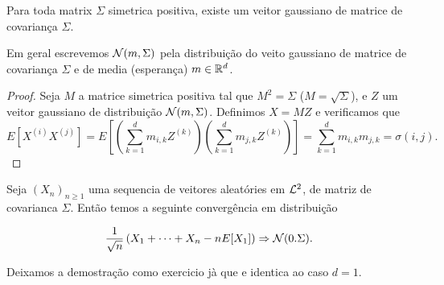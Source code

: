 \begin{proposition}
Para toda matrix $\Sigma$ simetrica positiva, existe um veitor gaussiano de matrice de covariança $\Sigma$.
\end{proposition}
Em geral escrevemos ${\mathcal N}(m,\Sigma)$ pela distribuição do veito gaussiano de matrice de covariança $\Sigma$ e de media (esperança) $m\in {\ensuremath{\mathbb R}}^d$.

\begin{proof}
 Seja $M$ a matrice simetrica positiva tal que $M^2=\Sigma$ ($M=\sqrt{\Sigma}$), e $Z$ um veitor gaussiano de distribuição ${\mathcal N}(m,\Sigma)$.
 Definimos $X=MZ$ e verificamos que
 \begin{equation}
 E[X^{(i)}X^{(j)}]=E[ \left(\sum_{k=1}^d m_{i,k} Z^{(k)}\right)\left(\sum_{k=1}^d m_{j,k} Z^{(k)}\right)]= \sum_{k=1}^d m_{i,k}m_{j,k}= \sigma(i,j).
\end{equation}
 \end{proof}


\begin{theorem}
 Seja $(X_n)_{n\ge 1}$ uma sequencia de veitores aleatóries em ${\mathcal L}^2$, de matriz de covarianca $\Sigma$.
 Então temos a seguinte convergência em distribuição

 \begin{equation}
  \frac{1}{\sqrt{n}}\left(X_1+\dots+X_n-n E[X_1]\right) \Rightarrow {\ensuremath{\mathcal N}}(0.\Sigma).
 \end{equation}

\end{theorem}

Deixamos a demostração como exercicio jà que e identica ao caso $d=1$.






